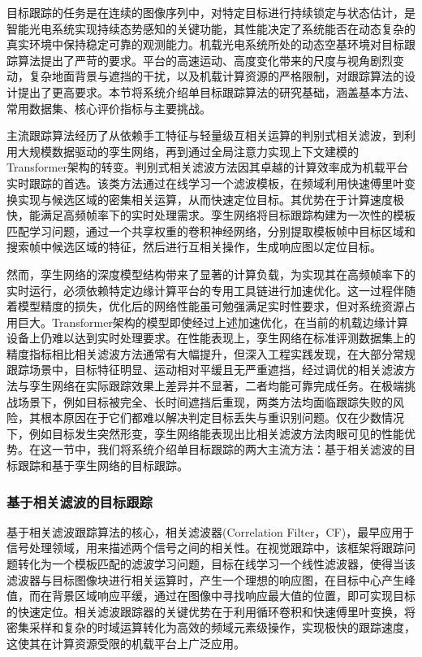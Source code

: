 目标跟踪的任务是在连续的图像序列中，对特定目标进行持续锁定与状态估计，是智能光电系统实现持续态势感知的关键功能，其性能决定了系统能否在动态复杂的真实环境中保持稳定可靠的观测能力。机载光电系统所处的动态空基环境对目标跟踪算法提出了严苛的要求。平台的高速运动、高度变化带来的尺度与视角剧烈变动，复杂地面背景与遮挡的干扰，以及机载计算资源的严格限制，对跟踪算法的设计提出了更高要求。本节将系统介绍单目标跟踪算法的研究基础，涵盖基本方法、常用数据集、核心评价指标与主要挑战。

主流跟踪算法经历了从依赖手工特征与轻量级互相关运算的判别式相关滤波，到利用大规模数据驱动的孪生网络\cite{HKBQ202401001}，再到通过全局注意力实现上下文建模的Transformer架构的转变。判别式相关滤波方法因其卓越的计算效率成为机载平台实时跟踪的首选。该类方法通过在线学习一个滤波模板，在频域利用快速傅里叶变换实现与候选区域的密集相关运算，从而快速定位目标。其优势在于计算速度极快\cite{JSJY201902042}，能满足高频帧率下的实时处理需求。孪生网络将目标跟踪构建为一次性的模板匹配学习问题，通过一个共享权重的卷积神经网络，分别提取模板帧中目标区域和搜索帧中候选区域的特征，然后进行互相关操作，生成响应图以定位目标。

然而，孪生网络的深度模型结构带来了显著的计算负载，为实现其在高频帧率下的实时运行，必须依赖特定边缘计算平台的专用工具链进行加速优化。这一过程伴随着模型精度的损失，优化后的网络性能虽可勉强满足实时性要求，但对系统资源占用巨大。Transformer架构的模型即使经过上述加速优化，在当前的机载边缘计算设备上仍难以达到实时处理要求。在性能表现上，孪生网络在标准评测数据集上的精度指标相比相关滤波方法通常有大幅提升，但深入工程实践发现，在大部分常规跟踪场景中，目标特征明显、运动相对平缓且无严重遮挡，经过调优的相关滤波方法与孪生网络在实际跟踪效果上差异并不显著，二者均能可靠完成任务。在极端挑战场景下，例如目标被完全、长时间遮挡后重现，两类方法均面临跟踪失败的风险，其根本原因在于它们都难以解决判定目标丢失与重识别问题。仅在少数情况下，例如目标发生突然形变，孪生网络能表现出比相关滤波方法肉眼可见的性能优势。在这一节中，我们将系统介绍单目标跟踪的两大主流方法：基于相关滤波的目标跟踪和基于孪生网络的目标跟踪。

\subsubsection{基于相关滤波的目标跟踪}
基于相关滤波跟踪算法的核心，相关滤波器(Correlation Filter，CF)，最早应用于信号处理领域，用来描述两个信号之间的相关性。在视觉跟踪中，该框架将跟踪问题转化为一个模板匹配的滤波学习问题，目标在线学习一个线性滤波器，使得当该滤波器与目标图像块进行相关运算时，产生一个理想的响应图，在目标中心产生峰值，而在背景区域响应平缓，通过在图像中寻找响应最大值的位置，即可实现目标的快速定位。相关滤波跟踪器的关键优势在于利用循环卷积和快速傅里叶变换，将密集采样和复杂的时域运算转化为高效的频域元素级操作，实现极快的跟踪速度，这使其在计算资源受限的机载平台上广泛应用。


